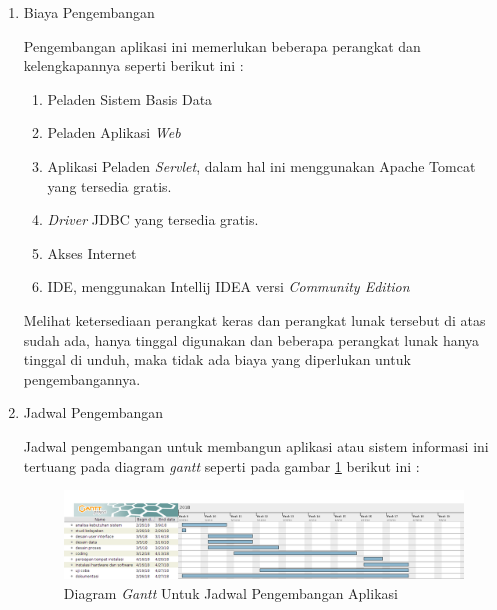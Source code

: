 \documentclass[pdftex,12pt, oneside]{article}
\begin{document}
\begin{enumerate}

\item Biaya Pengembangan

Pengembangan aplikasi ini memerlukan beberapa perangkat dan kelengkapannya seperti berikut ini :

\begin{enumerate}
	\item Peladen Sistem Basis Data
	\item Peladen Aplikasi \textit{Web} 
	\item Aplikasi Peladen \textit{Servlet}, dalam hal ini menggunakan Apache Tomcat yang tersedia gratis.
	\item \textit{Driver} JDBC yang tersedia gratis.
	\item Akses Internet
	\item IDE, menggunakan Intellij IDEA versi \textit{Community Edition}
\end{enumerate}

Melihat ketersediaan perangkat keras dan perangkat lunak tersebut di atas sudah ada, hanya tinggal digunakan dan beberapa perangkat lunak hanya tinggal di unduh, maka tidak ada biaya yang diperlukan untuk pengembangannya.

\item Jadwal Pengembangan

Jadwal pengembangan untuk membangun aplikasi atau sistem informasi ini tertuang pada diagram \textit{gantt} seperti pada gambar \ref{fig:gantt-chart} berikut ini :

\begin{figure}[H]
	\centering
	\includegraphics[width=1\textwidth]{./resources/gantt-chart}
	\caption{Diagram \textit{Gantt} Untuk Jadwal Pengembangan Aplikasi}
	\label{fig:gantt-chart}
\end{figure}

\end{enumerate}
\end{document}
